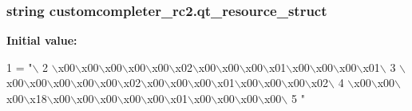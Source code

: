 \subsubsection[{qt\+\_\+resource\+\_\+struct}]{\setlength{\rightskip}{0pt plus 5cm}string customcompleter\+\_\+rc2.\+qt\+\_\+resource\+\_\+struct}\label{namespacecustomcompleter__rc2_a861b22cb25a30e46fbe567b07ac52269}
{\bfseries Initial value\+:}
\begin{DoxyCode}
1 = \textcolor{stringliteral}{"\(\backslash\)}
2 \textcolor{stringliteral}{\(\backslash\)x00\(\backslash\)x00\(\backslash\)x00\(\backslash\)x00\(\backslash\)x00\(\backslash\)x02\(\backslash\)x00\(\backslash\)x00\(\backslash\)x00\(\backslash\)x01\(\backslash\)x00\(\backslash\)x00\(\backslash\)x00\(\backslash\)x01\(\backslash\)}
3 \textcolor{stringliteral}{\(\backslash\)x00\(\backslash\)x00\(\backslash\)x00\(\backslash\)x00\(\backslash\)x00\(\backslash\)x02\(\backslash\)x00\(\backslash\)x00\(\backslash\)x00\(\backslash\)x01\(\backslash\)x00\(\backslash\)x00\(\backslash\)x00\(\backslash\)x02\(\backslash\)}
4 \textcolor{stringliteral}{\(\backslash\)x00\(\backslash\)x00\(\backslash\)x00\(\backslash\)x18\(\backslash\)x00\(\backslash\)x00\(\backslash\)x00\(\backslash\)x00\(\backslash\)x00\(\backslash\)x01\(\backslash\)x00\(\backslash\)x00\(\backslash\)x00\(\backslash\)x00\(\backslash\)}
5 \textcolor{stringliteral}{"}
\end{DoxyCode}
